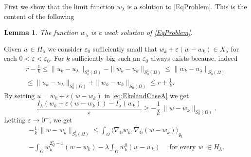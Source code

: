 \documentclass[11pt]{amsart}
\numberwithin{equation}{section} %
\newtheorem{lemma}[teo]{Lemma}
\theoremstyle{definition}
\def\G{\mathbb{G}}
\begin{document}
First we show that the limit function $w_{\lambda}$ is a solution to \eqref{EqProblem}. This is the content of the following

\begin{lemma}\label{lem:casoa1}
	The function $w_\lambda$ is a weak solution of \eqref{EqProblem}.
\end{lemma}
\proof
Given $w\in H_\lambda$ we consider $\varepsilon_0$
sufficiently small that $w_k+\varepsilon(w-w_k)\in X_\lambda$ for each $0<\varepsilon<\varepsilon_0$.
For $k$ sufficiently big such an $\varepsilon_0$ always exists 
because, indeed
\begin{multline*}
 r-\frac{1}{k}\leq \|u_k-u_\lambda\|_{S^1_0(\Omega)}-\|w_k-u_k\|_{S^1_0(\Omega)}\leq \|w_k-u_\lambda\|_{S^1_0(\Omega)}\\
 \leq \|u_k-u_\lambda\|_{S^1_0(\Omega)}+\|w_k-u_k\|_{S^1_0(\Omega)}\leq r+\frac{1}{k}.
\end{multline*}
By setting $u=w_k+\varepsilon(w-w_k)$ in \eqref{eq:EkelandCaseA}
we get
\[
\frac{I_\lambda(w_k+\varepsilon(w-w_k))-I_\lambda(w_k)}{\varepsilon}\geq -\frac{1}{k}\, \|w-w_k\|_{S^1_0(\Omega)}.
\]
Letting $\varepsilon\to0^+$, we get
\begin{multline}\label{eq:ineq2.21haitao}
		 -\frac{1}{k}\, \|w-w_k\|_{S^1_0(\Omega)}\leq \int_\Omega\langle \nabla_\G w_k,\nabla_\G(w-w_k)\rangle_{\mathfrak{g}_{1}}\\
	-\int_\Omega w_k^{2^\star_Q-1}(w-w_k)
		-\lambda \int_\Omega w_k^q(w-w_k)\quad\textrm{ for every } w\,\,\in H_\lambda.
\end{multline}
\end{document}
